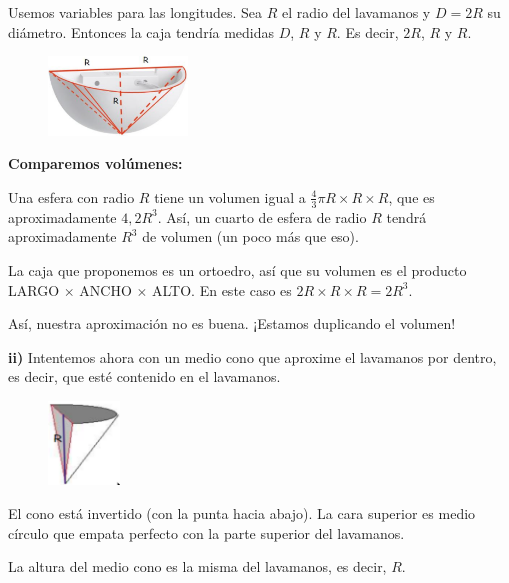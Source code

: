 \documentclass[12pt,a4paper]{article}
\begin{document}
Usemos variables para las longitudes. Sea $R$ el radio del lavamanos y $D = 2R$ su diámetro. Entonces la caja tendría medidas $D$, $R$ y $R$. Es decir, $2R$, $R$ y $R$.

\begin{figure}
\centering
\vspace{-5pt}
\includegraphics[width=0.33\textwidth]{Figuras/fig29c.png}
\vspace{-5pt}
\end{figure}

\textbf{Comparemos volúmenes:}

Una esfera con radio $R$ tiene un volumen igual a $\frac{4}{3}\pi R \times R \times R$, que es aproximadamente $4,2 R^3$. Así, un cuarto de esfera de radio $R$ tendrá aproximadamente $R^3$ de volumen (un poco más que eso).

La caja que proponemos es un ortoedro, así que su volumen es el producto LARGO $\times$ ANCHO $\times$ ALTO. En este caso es $2R \times R \times R = 2R^3$.

Así, nuestra aproximación no es buena. ¡Estamos duplicando el volumen!

\textbf{ii)} Intentemos ahora con un medio cono que aproxime el lavamanos por dentro, es decir, que esté contenido en el lavamanos.

\begin{figure}
\centering
\vspace{-5pt}
\includegraphics[width=0.17\textwidth]{Figuras/fig29d.png}
\vspace{-5pt}
\end{figure}

El cono está invertido (con la punta hacia abajo). La cara superior es medio círculo que empata perfecto con la parte superior del lavamanos.

La altura del medio cono es la misma del lavamanos, es decir, $R$.
\end{document}
